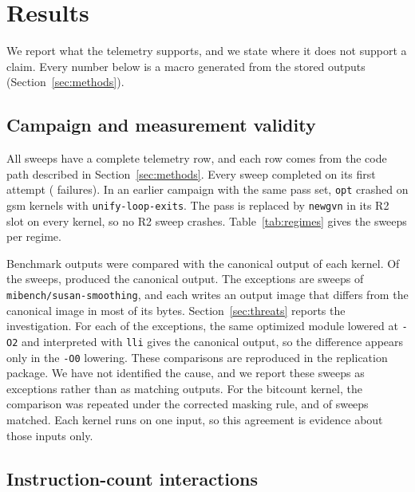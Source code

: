 \section{Results}
\label{sec:results}

We report what the telemetry supports, and we state where it does not support a claim. Every number below is a macro
generated from the stored outputs (Section~\ref{sec:methods}).

\subsection{Campaign and measurement validity}

All \NumSweeps{} sweeps have a complete telemetry row, and each row comes from the code path described in
Section~\ref{sec:methods}. Every sweep completed on its first attempt (\FirstPassFailures{} failures). In an earlier campaign with the same pass set, \texttt{opt} crashed on \ArchivedCrashes{} gsm kernels with \texttt{unify-loop-exits}. The pass
is replaced by \texttt{newgvn} in its R2 slot on every kernel, so no R2 sweep crashes. Table~\ref{tab:regimes} gives the sweeps
per regime.



Benchmark outputs were compared with the canonical output of each kernel. Of the \OutputsChecked{} sweeps, \OutputsAgreeing{}
produced the canonical output. The \OutputsDiffering{} exceptions are sweeps of \texttt{mibench/\allowbreak{}susan-smoothing}, and each writes
an output image that differs from the canonical image in most of its bytes. Section~\ref{sec:threats} reports the investigation.
For each of the exceptions, the same optimized module lowered at \texttt{-O2} and interpreted with \texttt{lli} gives the canonical output, so the difference appears only in the \texttt{-O0} lowering. These comparisons are reproduced in the replication package. We have not identified the cause, and we report
these sweeps as exceptions rather than as matching outputs. For the bitcount kernel, the comparison was repeated under the
corrected masking rule, and \BitcountRecheckMatching{} of \BitcountRecheckChecked{} sweeps matched. Each kernel runs on one input,
so this agreement is evidence about those inputs only.

\subsection{Instruction-count interactions}
\label{sec:results-instcount}

